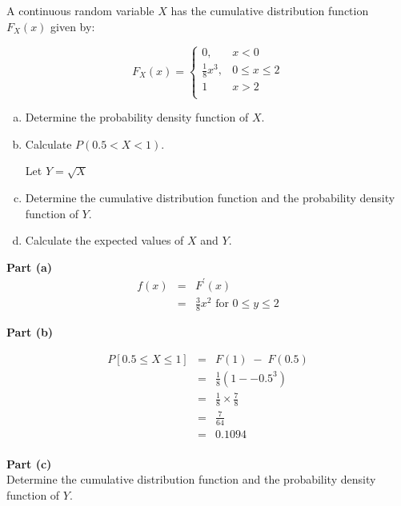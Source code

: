 \documentclass[a4paper,12pt]{article}
\begin{document}

\large
\noindent A continuous random variable $X$ has the cumulative distribution function $F_X(x)$ given
by:


\[ F_X(x) = \begin{cases}
0, & x <0 \\
\frac{1}{8}x^3 , & 0 \leq x \leq 2\\
1& x > 2 \\
\end{cases}\]

\begin{enumerate}[(a)]
\item Determine the probability density function of $X$. 
\item Calculate $P(0.5 <X< 1)$.

Let $Y =  \sqrt{X}$

\item Determine the cumulative distribution function and the probability density
function of $Y$. 
\item Calculate the expected values of $X$ and $Y$. 
\end{enumerate}



\medskip
\noindent \textbf{Part (a)}
\begin{eqnarray*}
f ( x ) &=& F ^{\prime} ( x ) \\  
&=& \frac{3}{8} x^2 \mbox{ for } 0 \leq y \leq 2
\end{eqnarray*}



\medskip
\noindent \textbf{Part (b)}

\begin{eqnarray*}
P [ 0.5 \leq  X \leq  1 ] &=& F ( 1 ) \; - \; F ( 0.5 ) \\
&=& \frac{1}{8} \left( 1 - -0.5^3 \right)\\
&=& \frac{1}{8} \times \frac{7}{8} \\
&=& \frac{7}{64}\\
&=& 0.1094 \\
\end{eqnarray*}


\medskip
\noindent \textbf{Part (c)}\\
\noindent Determine the cumulative distribution function and the probability density
function of $Y$. 
\end{document}
